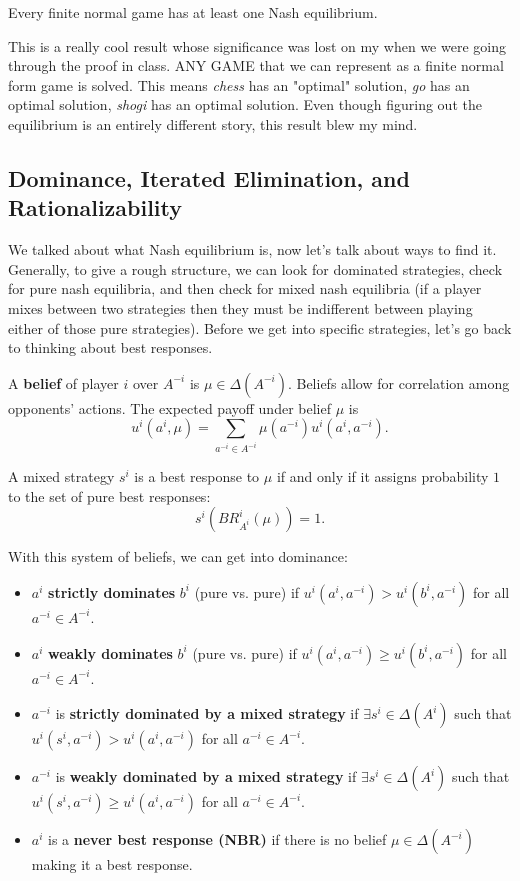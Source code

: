 \documentclass[11pt,english]{article}
\begin{document}
\begin{theorem}
Every finite normal game has at least one Nash equilibrium.
\end{theorem} This is a really cool result whose significance was lost on my when we were going through the proof in class. ANY GAME that we can represent as a finite normal form game is solved. This means \textit{chess} has an "optimal" solution, \textit{go} has an optimal solution, \textit{shogi} has an optimal solution. Even though figuring out the equilibrium is an entirely different story, this result blew my mind.

\subsection{Dominance, Iterated Elimination, and Rationalizability}
We talked about what Nash equilibrium is, now let's talk about ways to find it. Generally, to give a rough structure, we can look for dominated strategies, check for pure nash equilibria, and then check for mixed nash equilibria (if a player mixes between two strategies then they must be indifferent between playing either of those pure strategies). Before we get into specific strategies, let's go back to thinking about best responses.

\begin{definition}[Beliefs]
A \textbf{belief} of player $i$ over $A^{-i}$ is $\mu\in \Delta(A^{-i})$. Beliefs allow for correlation among opponents' actions. The expected payoff under belief $\mu$ is $$u^i(a^i, \mu) = \sum_{a^{-i}\in A^{-i}}\mu(a^{-i})u^i(a^i, a^{-i}).$$

A mixed strategy $s^i$ is a best response to $\mu$ if and only if it assigns probability $1$ to the set of pure best responses: $$s^i(BR^i_{A^i}(\mu)) = 1.$$
\end{definition}
\noindent With this system of beliefs, we can get into dominance:
\begin{itemize}
\item $a^i$ \textbf{strictly dominates} $b^i$ (pure vs. pure) if $u^i(a^i, a^{-i}) > u^i(b^i, a^{-i})$ for all $a^{-i}\in A^{-i}$.

\item $a^i$ \textbf{weakly dominates} $b^i$ (pure vs. pure) if $u^i(a^i, a^{-i}) \geq u^i(b^i, a^{-i})$ for all $a^{-i}\in A^{-i}$.

\item $a^{-i}$ is \textbf{strictly dominated by a mixed strategy} if $\exists s^i \in \Delta(A^i)$ such that $u^i(s^i, a^{-i}) > u^i(a^i, a^{-i})$ for all $a^{-i}\in A^{-i}$.

\item $a^{-i}$ is \textbf{weakly dominated by a mixed strategy} if $\exists s^i \in \Delta(A^i)$ such that $u^i(s^i, a^{-i}) \geq u^i(a^i, a^{-i})$ for all $a^{-i}\in A^{-i}$.

\item $a^i$ is a \textbf{never best response (NBR)} if there is no belief $\mu \in \Delta(A^{-i})$ making it a best response.
\end{itemize}
\end{document}

